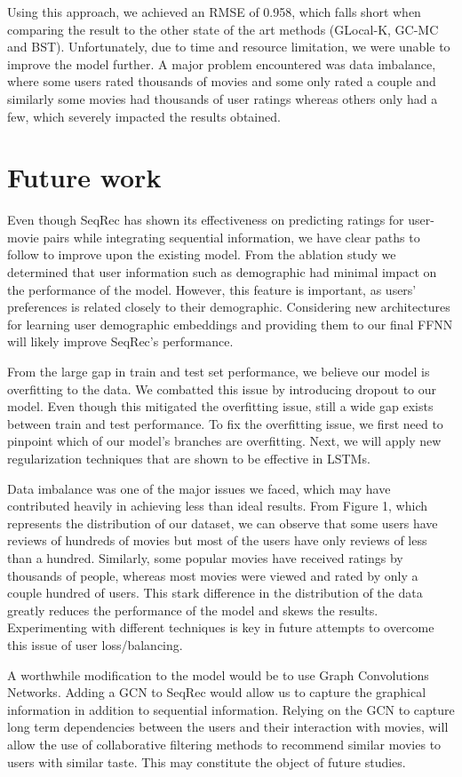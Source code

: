 \documentclass{bioinfo}
\begin{document}
Using this approach, we achieved an RMSE of 0.958, which falls short when comparing the result to the other state of the art methods (GLocal-K, GC-MC and BST). Unfortunately, due to time and resource limitation, we were unable to improve the model further. A major problem encountered was data imbalance, where some users rated thousands of movies and some only rated a couple and similarly some movies had thousands of user ratings whereas others only had a few, which severely impacted the results obtained.

\section{Future work}

Even though SeqRec has shown its effectiveness on predicting ratings for user-movie pairs while integrating sequential information, we have clear paths to follow to improve upon the existing model. From the ablation study we determined that user information such as demographic had minimal impact on the performance of the model. However, this feature is important, as users' preferences is related closely to their demographic. Considering new architectures for learning user demographic embeddings and providing them to our final FFNN will likely improve SeqRec's performance. 

From the large gap in train and test set performance, we believe our model is overfitting to the data. We combatted this issue by introducing dropout to our model. Even though this mitigated the overfitting issue, still a wide gap exists between train and test performance. To fix the overfitting issue, we first need to pinpoint which of our model's branches are overfitting. Next, we will apply new regularization techniques that are shown to be effective in LSTMs. 

Data imbalance was one of the major issues we faced, which may have contributed heavily in achieving less than ideal results. From Figure 1, which represents the distribution of our dataset, we can observe that some users have reviews of hundreds of movies but most of the users have only reviews of less than a hundred. Similarly, some popular movies have received ratings by thousands of people, whereas most movies were viewed and rated by only a couple hundred of users. This stark difference in the distribution of the data greatly reduces the performance of the model and skews the results. Experimenting with different techniques is key in future attempts to overcome this issue of user loss/balancing.

A worthwhile modification to the model would be to use Graph Convolutions Networks. Adding a GCN to SeqRec would allow us to capture the graphical information in addition to sequential information. Relying on the GCN to capture long term dependencies between the users and their interaction with movies, will allow the use of collaborative filtering methods to recommend similar movies to users with similar taste. This may constitute the object of future studies.



\end{document}
